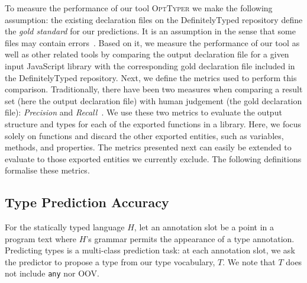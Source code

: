 \documentclass[acmsmall, review, anonymous]{acmart}\settopmatter{printfolios=true,printccs=false,printacmref=false}
\newcommand{\projectname}{\textsc{OptTyper}\xspace}
\begin{document}
To measure the performance of our tool \projectname we make the following assumption:
the existing declaration files on the DefinitelyTyped repository define the \textit{gold standard}
for our predictions.
It is an assumption in the sense that some files may contain errors~\citep{williams17}.
Based on it, we measure the performance of our tool as well as other related tools
by comparing the output declaration file for a given input JavaScript library
with the corresponding gold declaration file included in the DefinitelyTyped repository.
Next, we define the metrics used to perform this comparison.
Traditionally, there have been two measures when comparing a result set
(here the output declaration file) with human judgement (the gold declaration file):
\textit{Precision} and \textit{Recall}~\citep{russel16}.
We use these two metrics to evaluate the output structure and types for each of the exported functions in a library.
Here, we focus solely on functions and discard the other exported entities,
such as variables, methods, and properties.
The metrics presented next can easily be extended to evaluate to those exported
entities we currently exclude.
The following definitions formalise these metrics.



\subsection{Type Prediction Accuracy}

For the statically typed language $H$, let an annotation slot be a point in a program text where $H$'s grammar permits the appearance of a type annotation.  Predicting types is a multi-class prediction task: at each annotation slot, we ask the predictor to propose a type from our type vocabulary, $T$.  We note that $T$ does not include \texttt{any} nor OOV. 
\end{document}
